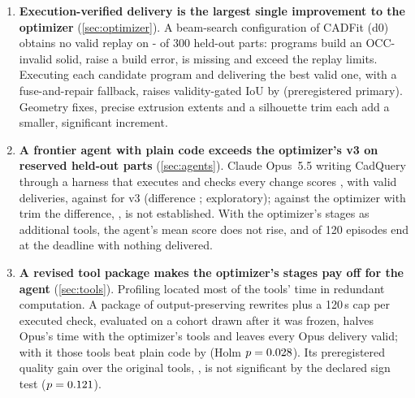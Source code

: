 \begin{enumerate}
\item \textbf{Execution-verified delivery is the largest single improvement to the optimizer} (\cref{sec:optimizer}). A beam-search configuration of CADFit (d0) obtains no valid replay on \the{}-\fDZeroValid\relax{} of 300 held-out parts: \fDZeroBuiltInvalid{} programs build an OCC-invalid solid, \fDZeroBuildError{} raise a build error, \fDZeroMissing{} is missing and \fDZeroResource{} exceed the replay limits. Executing each candidate program and delivering the best valid one, with a fuse-and-repair fallback, raises validity-gated IoU by \hDXvsDZero{} \hDXvsDZeroCI{} (preregistered primary). Geometry fixes, precise extrusion extents and a silhouette trim each add a smaller, significant increment.
\item \textbf{A frontier agent with plain code exceeds the optimizer's v3 on reserved held-out parts} (\cref{sec:agents}). Claude Opus~5.5 writing CadQuery through a harness that executes and checks every change scores \cOpusCode, with \cOpusCodeValid{} valid deliveries, against \cPipeVThree{} for v3 (difference \cOpusCodeVsVThree{} \cOpusCodeVsVThreeCI; exploratory); against the optimizer with trim the difference, \cOpusCodeVsTrim{} \cOpusCodeVsTrimCI, is not established. With the optimizer's stages as additional tools, the agent's mean score does not rise, and \cOpusSkillsNoOut{} of 120 episodes end at the deadline with nothing delivered.
\item \textbf{A revised tool package makes the optimizer's stages pay off for the agent} (\cref{sec:tools}). Profiling located most of the tools' time in redundant computation. A package of output-preserving rewrites plus a 120\,s cap per executed check, evaluated on a cohort drawn after it was frozen, halves Opus's time with the optimizer's tools and leaves every Opus delivery valid; with it those tools beat plain code by \tOpusSkillsVsCode{} (Holm $p=0.028$). Its preregistered quality gain over the original tools, \tOpusSkillsVersion{} \tOpusSkillsVersionCI, is not significant by the declared sign test ($p=0.121$).
\end{enumerate}
